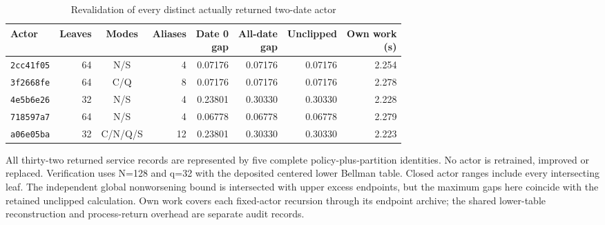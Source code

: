 \begin{table}[htbp]
\centering
\caption{Revalidation of every distinct actually returned two-date actor}\label{tab:fixed-policy61}
{\small\setlength{\tabcolsep}{3pt}
\begin{tabular}{lrcrrrrr}
\hline
Actor & Leaves & Modes & Aliases & \shortstack{Date 0\\gap} & \shortstack{All-date\\gap} & Unclipped & \shortstack{Own work\\(s)} \\
\hline
\texttt{2cc41f05} & 64 & N/S & 4 & 0.07176 & 0.07176 & 0.07176 & 2.254 \\
\texttt{3f2668fe} & 64 & C/Q & 8 & 0.07176 & 0.07176 & 0.07176 & 2.278 \\
\texttt{4e5b6e26} & 32 & N/S & 4 & 0.23801 & 0.30330 & 0.30330 & 2.228 \\
\texttt{718597a7} & 64 & N/S & 4 & 0.06778 & 0.06778 & 0.06778 & 2.279 \\
\texttt{a06e05ba} & 32 & C/N/Q/S & 12 & 0.23801 & 0.30330 & 0.30330 & 2.223 \\
\hline\end{tabular}}
\par\smallskip
{\footnotesize All thirty-two returned service records are represented by five complete policy-plus-partition identities. No actor is retrained, improved or replaced. Verification uses N=128 and q=32 with the deposited centered lower Bellman table. Closed actor ranges include every intersecting leaf. The independent global nonworsening bound is intersected with upper excess endpoints, but the maximum gaps here coincide with the retained unclipped calculation. Own work covers each fixed-actor recursion through its endpoint archive; the shared lower-table reconstruction and process-return overhead are separate audit records.}
\end{table}
